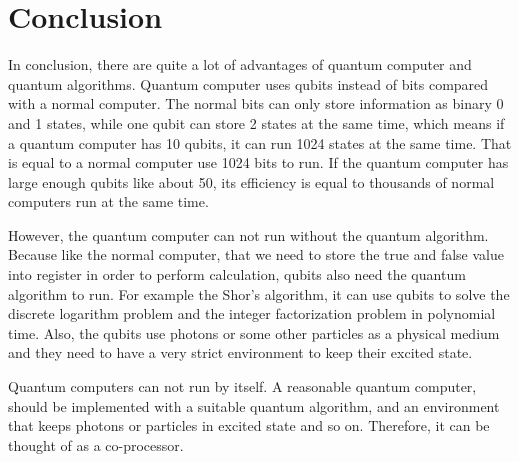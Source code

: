 \documentclass{article}
\begin{document}
\section{Conclusion}
In conclusion, there are quite a lot of advantages of quantum computer and quantum algorithms. Quantum computer uses qubits instead of bits compared with a normal computer. The normal bits can only store information as binary 0 and 1 states, while one qubit can store 2 states at the same time, which means if a quantum computer has 10 qubits, it can run 1024 states at the same time. That is equal to a normal computer use 1024 bits to run. If the quantum computer has large enough qubits like about 50, its efficiency is equal to thousands of normal computers run at the same time.

However, the quantum computer can not run without the quantum algorithm. Because like the normal computer, that we need to store the true and false value into register in order to perform calculation, qubits also need the quantum algorithm to run. For example the Shor’s algorithm, it can use qubits to solve the discrete logarithm problem and the integer factorization problem in polynomial time. 
Also,  the qubits use photons or some other particles as a physical medium and they need to have a very strict environment to keep their excited state. 

Quantum computers can not run by itself. A reasonable quantum computer, should be implemented with a suitable quantum algorithm, and an environment that  keeps photons or particles in excited state and so on. Therefore, it can be thought of as a co-processor.
\end{document}
